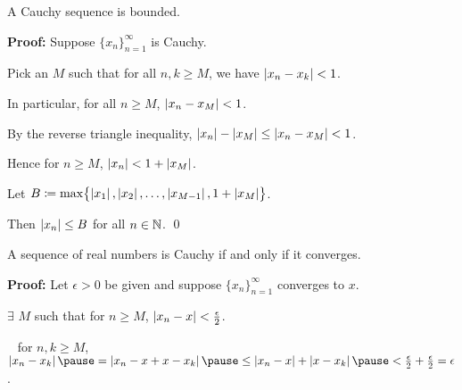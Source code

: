 \documentclass[10pt,aspectratio=169]{beamer}
\begin{document}
\begin{frame}

\begin{proposition}
A Cauchy sequence is bounded.
\end{proposition}

\pause
\textbf{Proof:}
Suppose $\{ x_n \}_{n=1}^\infty$ is Cauchy.

\pause
\medskip

Pick an $M$ such that for all
$n,k \geq M$, we have $\left\lvert {x_n-x_k} \right\rvert < 1$.

\pause
\medskip

In particular, 
for all $n \geq M$, \quad
$\left\lvert {x_n - x_M} \right\rvert < 1$.

\pause
By the reverse triangle inequality, \quad
$\left\lvert {x_n} \right\rvert - \left\lvert {x_M} \right\rvert \leq \left\lvert {x_n - x_M} \right\rvert < 1$.

\pause
\medskip

Hence for $n \geq M$, \quad
$\left\lvert {x_n} \right\rvert < 1 + \left\lvert {x_M} \right\rvert$.

\pause
\medskip

Let
$B \coloneqq \max \bigl\{ \left\lvert {x_1} \right\rvert, \left\lvert {x_2} \right\rvert, \ldots, \left\lvert {x_{M-1}} \right\rvert, 1+ \left\lvert {x_M} \right\rvert
\bigr\}$.

\pause
\medskip

Then $\left\lvert {x_n} \right\rvert \leq B$ for all $n \in {\mathbb{N}}$.
\qed
\end{frame}

\begin{frame}

\begin{theorem}
A sequence of real numbers is Cauchy if and only if it converges.
\end{theorem}

\pause
\textbf{Proof:}
Let $\epsilon > 0$ be given and
suppose $\{ x_n \}_{n=1}^\infty$ converges to $x$.

\pause
$\exists$ $M$ such that for $n \geq M$, \quad
$\left\lvert {x_n - x} \right\rvert < \frac{\epsilon}{2}$.

\pause
\medskip

\thus ~ for $n,k \geq M$,
\quad
$\abs{x_n - x_k}
\pause
= 
\abs{x_n - x + x - x_k}
\pause
\leq \abs{x_n-x} + \abs{x-x_k}
\pause
< \frac{\epsilon}{2} + \frac{\epsilon}{2} = \epsilon$.

\end{frame}
\end{document}
